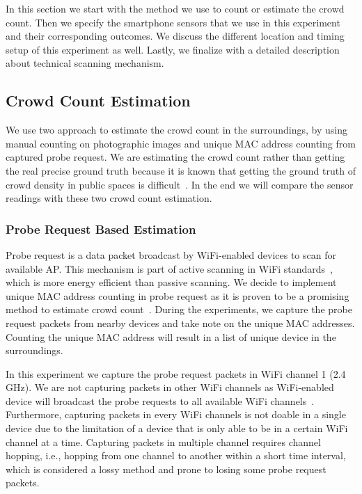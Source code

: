 In this section we start with the method we use to count or estimate the crowd count. Then we specify the smartphone sensors that we use in this experiment and their corresponding outcomes. We discuss the different location and timing setup of this experiment as well. Lastly, we finalize with a detailed description about technical scanning mechanism.


\subsection{Crowd Count Estimation} %
\label{sub:crowd_count_estimation}
We use two approach to estimate the crowd count in the surroundings, by using manual counting on photographic images and unique \ac{MAC} address counting from captured probe request. We are estimating the crowd count rather than getting the real precise ground truth because it is known that getting the ground truth of crowd density in public spaces is difficult~\cite{thesis041}. In the end we will compare the sensor readings with these two crowd count estimation.

	\subsubsection{Probe Request Based Estimation} %
	\label{ssub:probe_request_based_estimation}
	Probe request is a data packet broadcast by WiFi-enabled devices to scan for available \ac{AP}. This mechanism is part of active scanning in WiFi standards~\cite{thesis082}, which is more energy efficient than passive scanning. We decide to implement unique \ac{MAC} address counting in probe request as it is proven to be a promising method to estimate crowd count~\cite{thesis047}. During the experiments, we capture the probe request packets from nearby devices and take note on the unique \ac{MAC} addresses. Counting the unique \ac{MAC} address will result in a list of unique device in the surroundings.

	In this experiment we capture the probe request packets in WiFi channel 1 (2.4 GHz). We are not capturing packets in other WiFi channels as WiFi-enabled device will broadcast the probe requests to all available WiFi channels~\cite{thesis082}. Furthermore, capturing packets in every WiFi channels is not doable in a single device due to the limitation of a device that is only able to be in a certain WiFi channel at a time. Capturing packets in multiple channel requires channel hopping, i.e., hopping from one channel to another within a short time interval, which is considered a lossy method and prone to losing some probe request packets.

